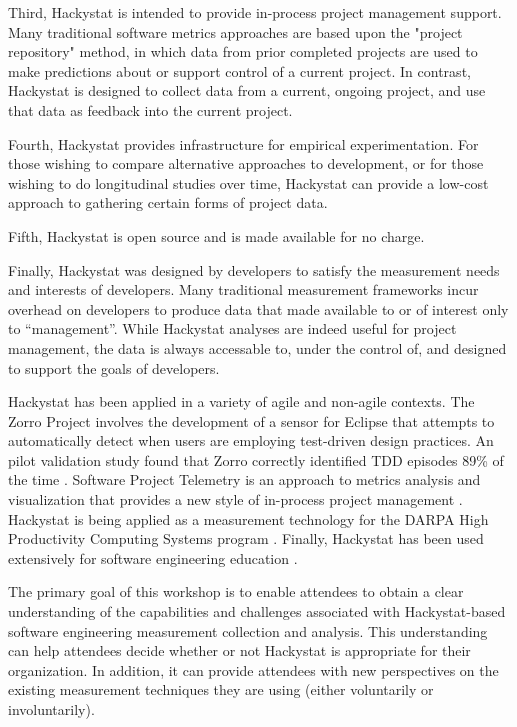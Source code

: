 \documentclass[11pt,twocolumn]{article}
\begin{document}
Third, Hackystat is intended to provide in-process project management
support. Many traditional software metrics approaches are based upon the
"project repository" method, in which data from prior completed projects
are used to make predictions about or support control of a current
project. In contrast, Hackystat is designed to collect data from a current,
ongoing project, and use that data as feedback into the current project.

Fourth, Hackystat provides infrastructure for empirical experimentation. For
those wishing to compare alternative approaches to development, or for
those wishing to do longitudinal studies over time, Hackystat can provide a
low-cost approach to gathering certain forms of project data.
 
Fifth, Hackystat is open source and is made available for no charge.

Finally, Hackystat was designed by developers to satisfy the measurement needs
and interests of developers.  Many traditional measurement frameworks incur
overhead on developers to produce data that made available to or of
interest only to ``management''.  While Hackystat analyses are indeed
useful for project management, the data is always accessable to, under the
control of, and designed to support the goals of developers. 

Hackystat has been applied in a variety of agile and non-agile contexts.
The Zorro Project involves the development of a sensor for Eclipse that
attempts to automatically detect when users are employing test-driven
design practices. An pilot validation study found that Zorro correctly
identified TDD episodes 89\% of the time \cite{csdl2-06-02}.  Software
Project Telemetry is an approach to metrics analysis and visualization that
provides a new style of in-process project management \cite{csdl2-04-11}.
Hackystat is being applied as a measurement technology for the DARPA High
Productivity Computing Systems program \cite{csdl2-04-22}.  Finally,
Hackystat has been used extensively for software engineering education
\cite{csdl2-03-12}.


The primary goal of this workshop is to enable attendees to obtain a clear
understanding of the capabilities and challenges associated with
Hackystat-based software engineering measurement collection and analysis.
This understanding can help attendees decide whether or not Hackystat is
appropriate for their organization. In addition, it can provide attendees
with new perspectives on the existing measurement techniques they are using
(either voluntarily or involuntarily). 
\end{document}

